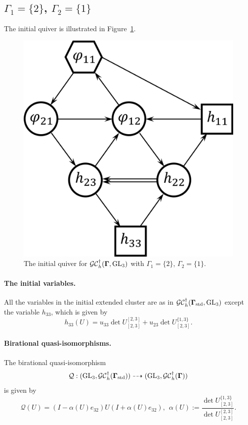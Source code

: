 \subsection{$\Gamma_1 = \{2\}$, $\Gamma_2 = \{1\}$}
The initial quiver is illustrated in Figure~\ref{f:h_n=3_2-1}. 
\begin{figure}[htb]
\begin{center}
\includegraphics[scale=0.65]{h_convention/h_n=3_2-1.png}
\end{center}
\caption{The initial quiver for $\mathcal{GC}_h^{\dagger}(\mathbf{\Gamma},\operatorname{GL}_3)$ with $\Gamma_1 = \{2\}$, $\Gamma_2  = \{1\}$.}
\label{f:h_n=3_2-1}
\end{figure}

\paragraph{The initial variables.} All the variables in the initial extended cluster are as in $\mathcal{GC}_{h}^{\dagger}(\mathbf{\Gamma}_{\text{std}},\operatorname{GL}_3)$ except the variable $h_{33}$, which is given by
\begin{equation}
    h_{33}(U) = u_{33} \det U^{[2,3]}_{[2,3]} + u_{23} \det U_{[2,3]}^{\{1,3\}}.
\end{equation}

\paragraph{Birational quasi-isomorphisms.} The birational quasi-isomorphism \[\mathcal{Q}: (\operatorname{GL}_3,\mathcal{GC}_h^{\dagger}(\mathbf{\Gamma}_{\text{std}})) \dashrightarrow (\operatorname{GL}_3,\mathcal{GC}_h^{\dagger}(\mathbf{\Gamma}))\]is given by
\begin{equation}
\mathcal{Q}(U)= (I-\alpha(U)e_{32})U(I+\alpha(U)e_{32}), \ \ \alpha(U):= \frac{\det U^{\{1,3\}}_{[2,3]}}{\det U^{[2,3]}_{[2,3]}}.
\end{equation}